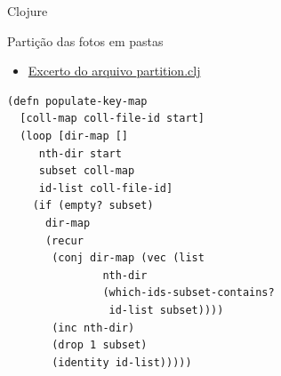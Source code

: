 \documentclass[bigger]{beamer}
\begin{document}
{\begin{frame}[label={sec:org84901e3},fragile]{Clojure}
 \begin{block}{Partição das fotos em pastas}
\begin{itemize}
\item \href{file:///home/buddhilw/PP/Scripts/devibrary/src/devibrary/partitioning.clj}{Excerto do arquivo \alert{partition.clj}}
\end{itemize}

\begin{verbatim}
(defn populate-key-map
  [coll-map coll-file-id start]
  (loop [dir-map []
	 nth-dir start
	 subset coll-map
	 id-list coll-file-id]
    (if (empty? subset)
      dir-map
      (recur
       (conj dir-map (vec (list
			   nth-dir
			   (which-ids-subset-contains?
			    id-list subset))))
       (inc nth-dir)
       (drop 1 subset)
       (identity id-list)))))
\end{verbatim}
\end{block}
\end{frame}

}
\end{document}
